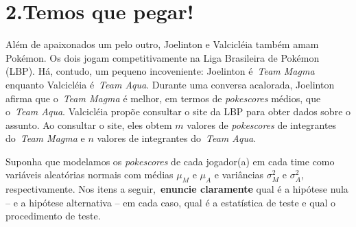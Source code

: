 \documentclass[a4paper,10pt, notitlepage]{report}
\begin{document}
\section*{2.Temos que pegar!}

Além de apaixonados um pelo outro, Joelinton e Valcicléia também amam Pokémon.
Os dois jogam competitivamente na Liga Brasileira de Pokémon (LBP).
Há, contudo, um pequeno incoveniente:  Joelinton é~\textit{Team Magma} enquanto Valcicléia é~\textit{Team Aqua}.
Durante uma conversa acalorada, Joelinton afirma que o~\textit{Team Magma} é melhor, em termos de \textit{pokescores} médios, que o~\textit{Team Aqua}.
Valcicléia propõe consultar o site da LBP para obter dados sobre o assunto.
Ao consultar o site, eles obtem $m$ valores de \textit{pokescores} de integrantes do~\textit{Team Magma} e $n$ valores de integrantes do~\textit{Team Aqua}.

Suponha que modelamos os \textit{pokescores} de cada jogador(a) em cada time como variáveis aleatórias normais com médias $\mu_{M}$ e $\mu_{A}$ e variâncias $\sigma_{M}^2$ e $\sigma_{A}^2$, respectivamente.
Nos itens a seguir,~\textbf{enuncie claramente} qual é a hipótese nula -- e a hipótese alternativa -- em cada caso, qual é a estatística de teste e qual o procedimento de teste.
\end{document}
